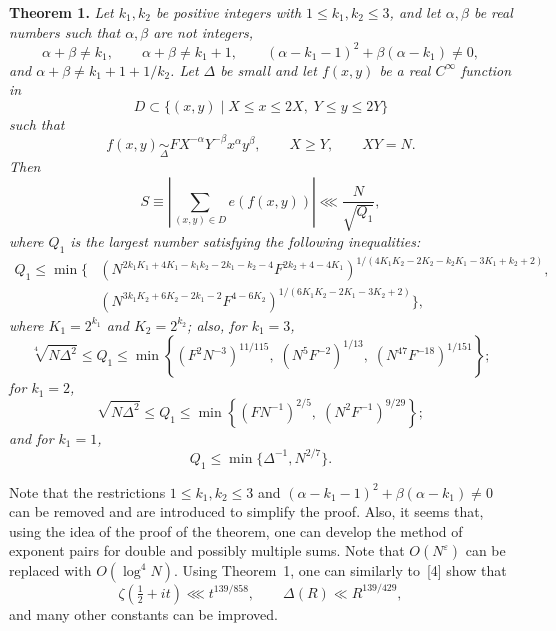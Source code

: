\documentclass[10pt]{article}
\begin{document}
\medskip
\noindent\textbf{Theorem 1.}
\textit{Let $k_1,k_2$ be positive integers with $1\leqslant k_1,k_2\leqslant3$, and let $\alpha,\beta$ be real numbers such that $\alpha,\beta$ are not integers,
\[
  \alpha+\beta\ne k_1,\qquad
  \alpha+\beta\ne k_1+1,\qquad
  (\alpha-k_1-1)^2+\beta(\alpha-k_1)\ne0,
\]
and $\alpha+\beta\ne k_1+1+1/k_2$. Let $\Delta$ be small and let $f(x,y)$ be a real $C^\infty$ function in
\[
  D\subset\{(x,y)\mid X\leqslant x\leqslant2X,\;Y\leqslant y\leqslant2Y\}
\]
such that
\[
  f(x,y)\underset{\Delta}{\sim}FX^{-\alpha}Y^{-\beta}x^\alpha y^\beta,
  \qquad X\geqslant Y,\qquad XY=N.
\]
Then
\[
  S\equiv\left|\sum_{(x,y)\in D}e(f(x,y))\right|\lll\frac N{\sqrt{Q_1}},
\]
where $Q_1$ is the largest number satisfying the following inequalities:
\begin{equation}
\begin{aligned}
Q_1\leqslant\min\Bigg\{&
\left(N^{2k_1K_1+4K_1-k_1k_2-2k_1-k_2-4}
      F^{2k_2+4-4K_1}\right)^{\!1/(4K_1K_2-2K_2-k_2K_1-3K_1+k_2+2)},\\
&\left(N^{3k_1K_2+6K_2-2k_1-2}F^{4-6K_2}\right)^{\!1/(6K_1K_2-2K_1-3K_2+2)}
\Bigg\},
\end{aligned}
\tag{5}
\end{equation}
where $K_1=2^{k_1}$ and $K_2=2^{k_2}$; also, for $k_1=3$,
\[
  \sqrt[4]{N\Delta^2}\leqslant Q_1\leqslant
  \min\left\{(F^2N^{-3})^{11/115},\;(N^5F^{-2})^{1/13},\;(N^{47}F^{-18})^{1/151}\right\};
\]
for $k_1=2$,
\[
  \sqrt{N\Delta^2}\leqslant Q_1\leqslant
  \min\left\{(FN^{-1})^{2/5},\;(N^2F^{-1})^{9/29}\right\};
\]
and for $k_1=1$,
\[
  Q_1\leqslant\min\{\Delta^{-1},N^{2/7}\}.
\]}

Note that the restrictions $1\leqslant k_1,k_2\leqslant3$ and $(\alpha-k_1-1)^2+\beta(\alpha-k_1)\ne0$ can be removed and are introduced to simplify the proof. Also, it seems that, using the idea of the proof of the theorem, one can develop the method of exponent pairs for double and possibly multiple sums. Note that $O(N^\varepsilon)$ can be replaced with $O(\log^4N)$. Using Theorem~1, one can similarly to~[4] show that
\[
  \zeta\left(\tfrac12+it\right)\lll t^{139/858},
  \qquad \Delta(R)\ll R^{139/429},
\]
and many other constants can be improved.
\end{document}

